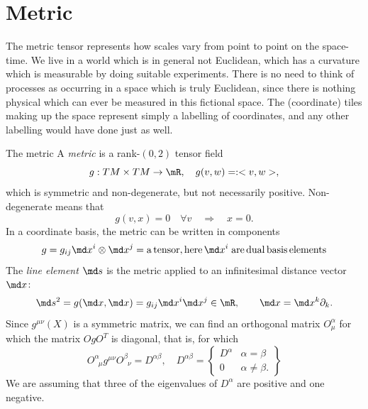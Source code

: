 \section{Metric}

The metric tensor represents how scales vary from point to point on the space-time. We live in a world which is in general not Euclidean, which has a curvature which is measurable by doing suitable experiments. There is no need to think of processes as occurring in a space which is truly Euclidean, since there is nothing physical which can ever be measured in this fictional space. The (coordinate) tiles making up the space represent simply a labelling of coordinates, and any other labelling would have done just as well.


\begin{mybox}{The metric}
	A \emph{metric} is a rank-$(0,2)$ tensor field
	\begin{equation}
	g :TM \times TM \rightarrow \mR, \quad g(v,w) =: <v,w>,
	\end{equation}
	which is symmetric and non-degenerate, but not necessarily positive. Non-degenerate means that
	\begin{equation}
	g(v,x) = 0 \quad \forall v \quad \Rightarrow \quad x = 0.
	\end{equation} In a coordinate basis, the metric can be written in components 
	\begin{equation}
	g = g_{i j } \md x^i \otimes \md x^j = \mathrm{ a \, tensor, here}\, \md x^i\; \mathrm{ are\, dual\, basis \,elements}
	\end{equation}
	The \emph{line element} $\md s$ is the metric applied to an infinitesimal distance vector $\md x$:
	\begin{equation}
\md s^2 = g(\md x, \md x) = g_{ij} \md x^i \md x^j \in \mR, \qquad \md x= \md x^k \partial_k.
	\end{equation}
	Since $g^{\mu \nu}(X)$ is a symmetric matrix, we can find an orthogonal matrix $O^\alpha_\mu$ for which the matrix $OgO^T$ is diagonal, that is, for which
	\begin{equation}
		O^\alpha_{\;\;\mu} g^{\mu \nu} O^\beta_{\;\; \nu} = D^{\alpha \beta} ,\quad D^{\alpha \beta} = \left\{\begin{array}{lr}
		D^\alpha & \alpha=\beta \\
		0 & \alpha \neq \beta.
		\end{array}			\right\}
	\end{equation}
	We are assuming that three of the eigenvalues of $D^\alpha$ are positive and one negative.
\end{mybox}

